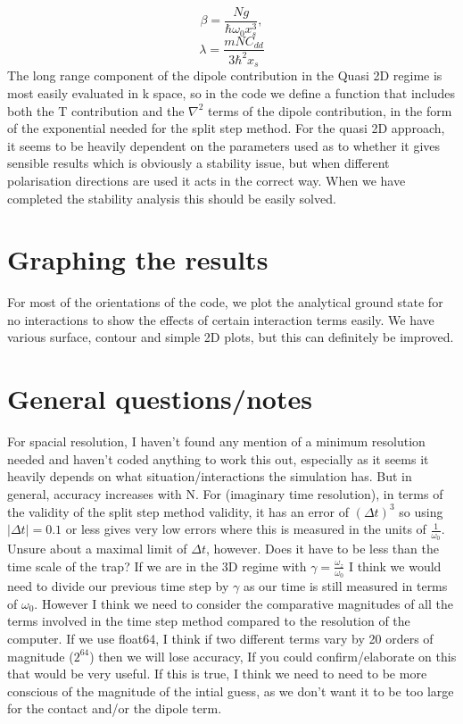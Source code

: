 \documentclass[12pt]{article}
\begin{document}
\begin{equation}
\beta=\frac{Ng}{\hbar\omega_{0}x_{s}^{3}},
\end{equation}
\begin{equation}
\lambda=\frac{mNC_{dd}}{3\hbar^{2}x_{s}}
\end{equation}
The long range component of the dipole contribution in the Quasi 2D regime is most easily evaluated in k space, so in the code we define a function that includes both the T contribution and the $\nabla^{2}$ terms of the dipole contribution, in the form of the exponential needed for the split step method.
For the quasi 2D approach, it seems to be heavily dependent on the parameters used as to whether it gives sensible results which is obviously a stability issue, but when different polarisation directions are used it acts in the correct way. When we have completed the stability analysis this should be easily solved.
\section{Graphing the results}
For most of the orientations of the code, we plot the analytical ground state for no interactions to show the effects of certain interaction terms easily. We have various surface, contour and simple 2D plots, but this can definitely be improved. 
\section{General questions/notes}
For spacial resolution, I haven't found any mention of a minimum resolution needed and haven't coded anything to work this out, especially as it seems it heavily depends on what situation/interactions the simulation has. But in general, accuracy increases with N.
For (imaginary time resolution), in terms of the validity of the split step method validity, it has an error of $(\Delta t)^{3}$ so using $|\Delta t| = 0.1$ or less gives very low errors where this is measured in the units of $\frac{1}{\omega_{0}}$. Unsure about a maximal limit of $\Delta t$, however. Does it have to be less than the time scale of the trap?
If we are in the 3D regime with $\gamma=\frac{\omega_{z}}{\omega_{0}}$ I think we would need to divide our previous time step by $\gamma$ as our time is still measured in terms of $\omega_{0}$. However I think we need to consider the comparative magnitudes of all the terms involved in the time step method compared to the resolution of the computer. If we use float64, I think if two different terms vary by 20 orders of magnitude ($2^{64}$) then we will lose accuracy, If you could confirm/elaborate on this that would be very useful. If this is true, I think we need to need to be more conscious of the magnitude of the intial guess, as we don't want it to be too large for the contact and/or the dipole term. 
\end{document}
